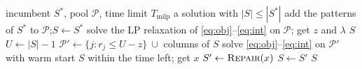 \begin{algorithm}[t]
\caption{$\textsc{Recombine}(S^*,\mathcal{P},T_{\mathrm{milp}})$}
\label{alg:recombine}
\begin{algorithmic}[1]
\Require incumbent $S^*$, pool $\mathcal{P}$, time limit $T_{\mathrm{milp}}$
\Ensure a solution with $|S|\le|S^*|$
\State add the patterns of $S^*$ to $\mathcal{P}$;\quad $S\gets S^*$
\Loop
  \State solve the LP relaxation of \eqref{eq:obj}--\eqref{eq:int} on $\mathcal{P}$; get $z$ and $\lambda$
   \State \Return $S$ 
  \EndIf
  \State $U\gets|S|-1$
  \State $\mathcal{P}'\gets\{j: r_j\le U-z\}\ \cup$ columns of $S$ 
  \State solve \eqref{eq:obj}--\eqref{eq:int} on $\mathcal{P}'$ with warm start $S$ within the time left; get $x$
  \State $S'\gets\textsc{Repair}(x)$
   $S\gets S'$ \Else \State \Return $S$ \EndIf
\EndLoop
\end{algorithmic}
\end{algorithm}

